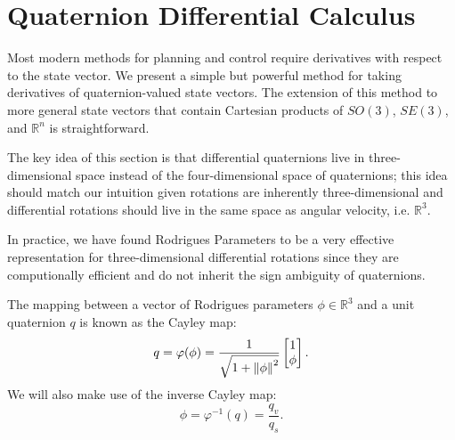 \documentclass[letterpaper, 10 pt, conference]{ieeeconf}  %
\newcommand{\R}{\mathbb{R}}
\newcommand{\Q}{\mathbb{S}^3}
\begin{document}
\section{Quaternion Differential Calculus} \label{sec:Quaternion_Calculus}
    Most modern methods for planning and control require derivatives with respect to the
    state vector. We present a simple but powerful method for taking derivatives of 
    quaternion-valued state vectors. The extension of this method to more general state vectors that contain Cartesian products of $SO(3)$, $SE(3)$, and $\mathbb{R}^n$ is straightforward.

    The key idea of this section is that differential quaternions live in
    three-dimensional space instead of the four-dimensional space of quaternions; this
    idea should match our intuition given rotations are inherently three-dimensional and
    differential rotations should live in the same space as angular velocity, i.e.
    $\R^3$.

    In practice, we have found Rodrigues Parameters to be a very effective representation
    for three-dimensional differential rotations since they are computionally efficient
    and do not inherit the sign ambiguity of quaternions.
    
    The mapping between a vector of Rodrigues parameters $\phi \in \R^3$ and a unit
    quaternion $q$ is known as the Cayley map:
    \begin{equation} \label{eq:cayley}
        q = \varphi(\phi) = \frac{1}{\sqrt{1 + \norm{\phi}^2}} \begin{bmatrix} 1 \\ \phi \end{bmatrix}.
    \end{equation}
    We will also make use of the inverse Cayley map:
    \begin{equation} \label{eq:invcayley}
        \phi = \varphi^{-1}(q) = \frac{q_v}{q_s}.
    \end{equation}
\end{document}
